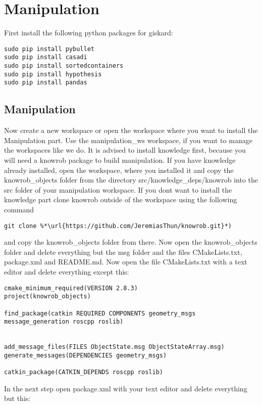 \documentclass[main.tex]{subfiles}
\begin{document}
\section{Manipulation}
\label{sec:Manipulation}

First install the following python packages for giskard:\\

\begin{lstlisting}
sudo pip install pybullet
sudo pip install casadi
sudo pip install sortedcontainers
sudo pip install hypothesis
sudo pip install pandas
\end{lstlisting}
	
	\subsection{Manipulation}
Now create a new workspace or open the workspace where you want to install the Manipulation part. Use the manipulation\_ws workspace, if you want to manage the workspaces like we do.
It is advised to install knowledge first, because you will need a knowrob package to build manipulation.
If you have knowledge already installed, open the workspace, where you installed it and copy the knowrob\_objects folder from the directory src/knowledge\_deps/knowrob into the src folder of your manipulation workspace. If you dont want to install the knowledge part clone knowrob outside of the workspace using the following command\\
\begin{lstlisting}
git clone %*\url{https://github.com/JeremiasThun/knowrob.git}*)
\end{lstlisting}
and copy the knowrob\_objects folder from there.
 Now open the knowrob\_objects folder and delete everything but  the msg folder and the files CMakeLists.txt, package.xml and README.md.
Now open the file CMakeLists.txt with a text editor and delete everything except this:\\
\begin{lstlisting}
cmake_minimum_required(VERSION 2.8.3)
project(knowrob_objects)

find_package(catkin REQUIRED COMPONENTS geometry_msgs message_generation roscpp roslib)


add_message_files(FILES ObjectState.msg ObjectStateArray.msg)
generate_messages(DEPENDENCIES geometry_msgs)

catkin_package(CATKIN_DEPENDS roscpp roslib)
\end{lstlisting}
In the next step open package.xml with your text editor and delete everything but this:\\
\end{document}
